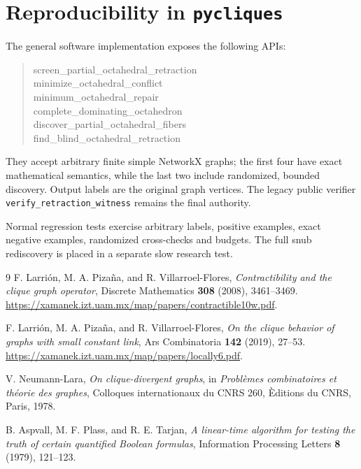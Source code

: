\documentclass[11pt]{article}
\begin{document}
\section{Reproducibility in \texttt{pycliques}}
The general software implementation exposes the following APIs:
\begin{quote}\small\ttfamily
screen\_partial\_octahedral\_retraction\\
minimize\_octahedral\_conflict\\
minimum\_octahedral\_repair\\
complete\_dominating\_octahedron\\
discover\_partial\_octahedral\_fibers\\
find\_blind\_octahedral\_retraction
\end{quote}
They accept arbitrary finite simple NetworkX graphs; the first four
have exact mathematical semantics, while the last two include
randomized, bounded discovery. Output labels are the original graph
vertices. The legacy public verifier
\texttt{verify\_retraction\_witness} remains the final authority.

Normal regression tests exercise arbitrary labels, positive examples,
exact negative examples, randomized cross-checks and budgets. The
full snub rediscovery is placed in a separate slow research test.

\begin{thebibliography}{9}
F. Larri\'on, M. A. Piza\~na, and R. Villarroel-Flores,
\emph{Contractibility and the clique graph operator},
Discrete Mathematics \textbf{308} (2008), 3461--3469.
\url{https://xamanek.izt.uam.mx/map/papers/contractible10w.pdf}.

F. Larri\'on, M. A. Piza\~na, and R. Villarroel-Flores,
\emph{On the clique behavior of graphs with small constant link},
Ars Combinatoria \textbf{142} (2019), 27--53.
\url{https://xamanek.izt.uam.mx/map/papers/locally6.pdf}.

V. Neumann-Lara,
\emph{On clique-divergent graphs},
in \emph{Probl\`emes combinatoires et th\'eorie des graphes},
Colloques internationaux du CNRS 260, \`Editions du CNRS, Paris, 1978.

B. Aspvall, M. F. Plass, and R. E. Tarjan,
\emph{A linear-time algorithm for testing the truth of certain
quantified Boolean formulas},
Information Processing Letters \textbf{8} (1979), 121--123.
\end{thebibliography}
\end{document}
